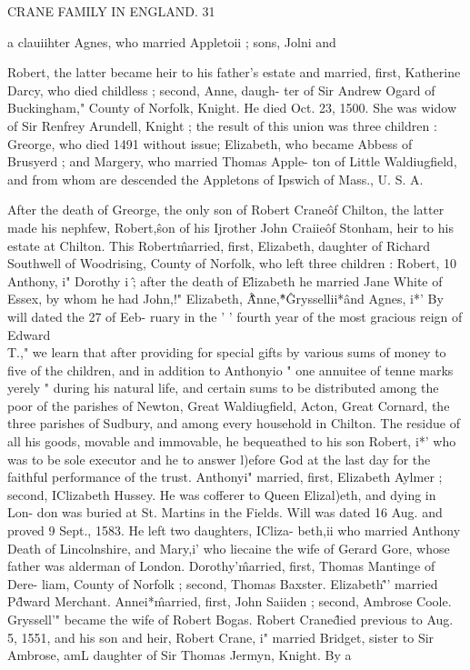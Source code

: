 \documentclass{book}
\begin{document}
CRANE FAMILY IN ENGLAND. 31 

a clauiihter Agnes, who married Appletoii ; sons, Jolni and 

Robert, the latter became heir to his father's estate and married, 
first, Katherine Darcy, who died childless ; second, Anne, daugh- 
ter of Sir Andrew Ogard of Buckingham," County of Norfolk, 
Knight. He died Oct. 23, 1500. She was widow of Sir Renfrey 
Arundell, Knight ; the result of this union was three children : 
Greorge, who died 1491 without issue; Elizabeth, who became 
Abbess of Brusyerd ; and Margery, who married Thomas Apple- 
ton of Little Waldiugfield, and from whom are descended the 
Appletons of Ipswich of Mass., U. S. A. 

After the death of Greorge, the only son of Robert Crane\^ of 
Chilton, the latter made his nephfew, Robert,\^ son of his Ijrother 
John Craiie\^ of Stonham, heir to his estate at Chilton. This 
Robert\^ married, first, Elizabeth, daughter of Richard Southwell 
of Woodrising, County of Norfolk, who left three children : 
Robert, 10 Anthony, i" Dorothy i \^ ; after the death of E\^lizabeth he 
married Jane White of Essex, by whom he had John,!" Elizabeth, \^\^\^ 
Anne,\^*\^ Gryssellii*\^ and Agnes, i*' By will dated the 27 of Eeb- 
ruary in the ' ' fourth year of the most gracious reign of Edward 
\\T.," we learn that after providing for special gifts by various 
sums of money to five of the children, and in addition to Anthonyio 
" one annuitee of tenne marks yerely " during his natural life, and 
certain sums to be distributed among the poor of the parishes of 
Newton, Great Waldiugfield, Acton, Great Cornard, the three 
parishes of Sudbury, and among every household in Chilton. The 
residue of all his goods, movable and immovable, he bequeathed 
to his son Robert, i*' who was to be sole executor and he to answer 
l)efore God at the last day for the faithful performance of the trust. 
Anthonyi" married, first, Elizabeth Aylmer ; second, IClizabeth 
Hussey. He was cofferer to Queen Elizal)eth, and dying in Lon- 
don was buried at St. Martins in the Fields. Will was dated 16 
Aug. and proved 9 Sept., 1583. He left two daughters, ICliza- 
beth,ii who married Anthony Death of Lincolnshire, and Mary,i' 
who liecaine the wife of Gerard Gore, whose father was alderman 
of London. Dorothy'\^ married, first, Thomas Mantinge of Dere- 
liam, County of Norfolk ; second, Thomas Baxster. Elizabeth\^'' 
married P\^dward Merchant. Annei*\^ married, first, John Saiiden ; 
second, Ambrose Coole. Gryssell'" became the wife of Robert 
Bogas. Robert Crane\^ died previous to Aug. 5, 1551, and his 
son and heir, Robert Crane, i" married Bridget, sister to Sir 
Ambrose, amL daughter of Sir Thomas Jermyn, Knight. By a 
\end{document}
